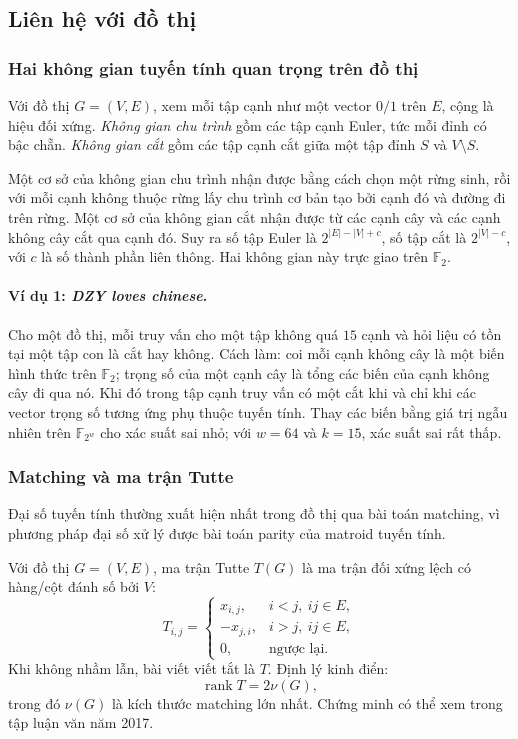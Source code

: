 \documentclass[11pt]{article}
\begin{document}
\subsection{Liên hệ với đồ thị}

\subsubsection{Hai không gian tuyến tính quan trọng trên đồ thị}

Với đồ thị $G=(V,E)$, xem mỗi tập cạnh như một vector $0/1$ trên $E$, cộng là
hiệu đối xứng. \emph{Không gian chu trình} gồm các tập cạnh Euler, tức mỗi đỉnh
có bậc chẵn. \emph{Không gian cắt} gồm các tập cạnh cắt giữa một tập đỉnh $S$ và
$V\setminus S$.

Một cơ sở của không gian chu trình nhận được bằng cách chọn một rừng sinh, rồi
với mỗi cạnh không thuộc rừng lấy chu trình cơ bản tạo bởi cạnh đó và đường đi
trên rừng. Một cơ sở của không gian cắt nhận được từ các cạnh cây và các cạnh
không cây cắt qua cạnh đó. Suy ra số tập Euler là $2^{|E|-|V|+c}$, số tập cắt là
$2^{|V|-c}$, với $c$ là số thành phần liên thông. Hai không gian này trực giao
trên $\mathbb F_2$.

\paragraph{Ví dụ 1: \emph{DZY loves chinese}.}
Cho một đồ thị, mỗi truy vấn cho một tập không quá $15$ cạnh và hỏi liệu có tồn
tại một tập con là cắt hay không. Cách làm: coi mỗi cạnh không cây là một biến
hình thức trên $\mathbb F_2$; trọng số của một cạnh cây là tổng các biến của
cạnh không cây đi qua nó. Khi đó trong tập cạnh truy vấn có một cắt khi và chỉ
khi các vector trọng số tương ứng phụ thuộc tuyến tính. Thay các biến bằng giá
trị ngẫu nhiên trên $\mathbb F_{2^w}$ cho xác suất sai nhỏ; với $w=64$ và
$k=15$, xác suất sai rất thấp.

\subsubsection{Matching và ma trận Tutte}

Đại số tuyến tính thường xuất hiện nhất trong đồ thị qua bài toán matching, vì
phương pháp đại số xử lý được bài toán parity của matroid tuyến tính.

Với đồ thị $G=(V,E)$, ma trận Tutte $T(G)$ là ma trận đối xứng lệch có hàng/cột
đánh số bởi $V$:
\[
  T_{i,j}=
  \begin{cases}
    x_{i,j}, & i<j,\ ij\in E,\\
    -x_{j,i}, & i>j,\ ij\in E,\\
    0, & \text{ngược lại}.
  \end{cases}
\]
Khi không nhầm lẫn, bài viết viết tắt là $T$. Định lý kinh điển:
\[
  \operatorname{rank}T=2\nu(G),
\]
trong đó $\nu(G)$ là kích thước matching lớn nhất. Chứng minh có thể xem trong
tập luận văn năm 2017.
\end{document}
